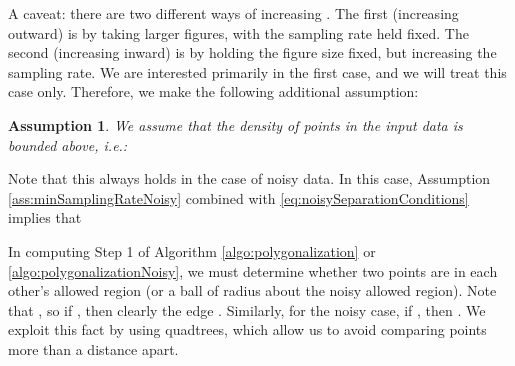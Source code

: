 \documentclass{article}
\newtheorem{assumption}{Assumption}
\numberwithin{cntr}{section}
\numberwithin{equation}{section}
\begin{document}
A caveat: there are two different ways of increasing . The first (increasing outward) is by taking larger figures, with the sampling rate held fixed. The second (increasing inward) is by holding the figure size fixed, but increasing the sampling rate. We are interested primarily in the first case, and we will treat this case only. Therefore, we make the following additional assumption:

\begin{assumption}
  \label{ass:sampleDensity}
  We assume that the density of points in the input data is bounded above, i.e.:
  
\end{assumption}

Note that this always holds in the case of noisy data. In this case, Assumption \ref{ass:minSamplingRateNoisy} combined with \eqref{eq:noisySeparationConditions} implies that


In computing Step 1 of Algorithm \ref{algo:polygonalization} or \ref{algo:polygonalizationNoisy}, we must determine whether two points are in each other's allowed region (or a ball of radius  about the noisy allowed region). Note that , so if , then clearly the edge . Similarly, for the noisy case, if , then . We exploit this fact by using quadtrees, which allow us to avoid comparing points more than a distance  apart.

\vspace{.2in}
\end{document}
